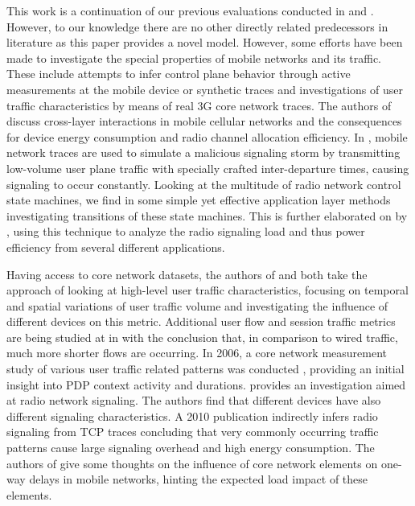 This work is a continuation of our previous evaluations conducted in \cite{metzger2012research} and \cite{metzger2013}. However, to our knowledge there are no other directly related predecessors in literature as this paper provides a novel model. However, some efforts have been made to investigate the special properties of mobile networks and its traffic. These include attempts to infer control plane behavior through active measurements at the mobile device or synthetic traces and investigations of user traffic characteristics by means of real 3G core network traces.
The authors of \cite{qian2011profiling} discuss cross-layer interactions in mobile cellular networks and the consequences for device energy consumption and radio channel allocation efficiency. In \cite{lee2007detection}, mobile network traces are used to simulate a malicious signaling storm by transmitting low-volume user plane traffic with specially crafted inter-departure times, causing signaling to occur constantly. Looking at the multitude of radio network control state machines, we find in \cite{5360763} some simple yet effective application layer methods investigating transitions of these state machines. This is further elaborated on by \cite{schwartz2013angrybirds}, using this technique to analyze the radio signaling load and thus power efficiency from several different applications.

Having access to core network datasets, the authors of \cite{shafiq2011characterizing} and \cite{paul2011understanding} both take the approach of looking at high-level user traffic characteristics, focusing on temporal and spatial variations of user traffic volume and investigating the influence of different devices on this metric. Additional user flow and session traffic metrics are being studied at in \cite{Zhang:2012:UCC:2377677.2377764} with the conclusion that, in comparison to wired traffic, much more shorter flows are occurring. In 2006, a core network measurement study of various user traffic related patterns was conducted \cite{svoboda2006composition}, providing an initial insight into \gls{PDP} context activity and durations. \cite{he2012panoramic} provides an investigation aimed at radio network signaling. The authors find that different devices have also different signaling characteristics. A 2010 publication \cite{Qian:2010:CRR:1879141.1879159} indirectly infers radio signaling from TCP traces concluding that very commonly occurring traffic patterns cause large signaling overhead and high energy consumption. The authors of \cite{4675847} give some thoughts on the influence of core network elements on one-way delays in mobile networks, hinting the expected load impact of these elements.

